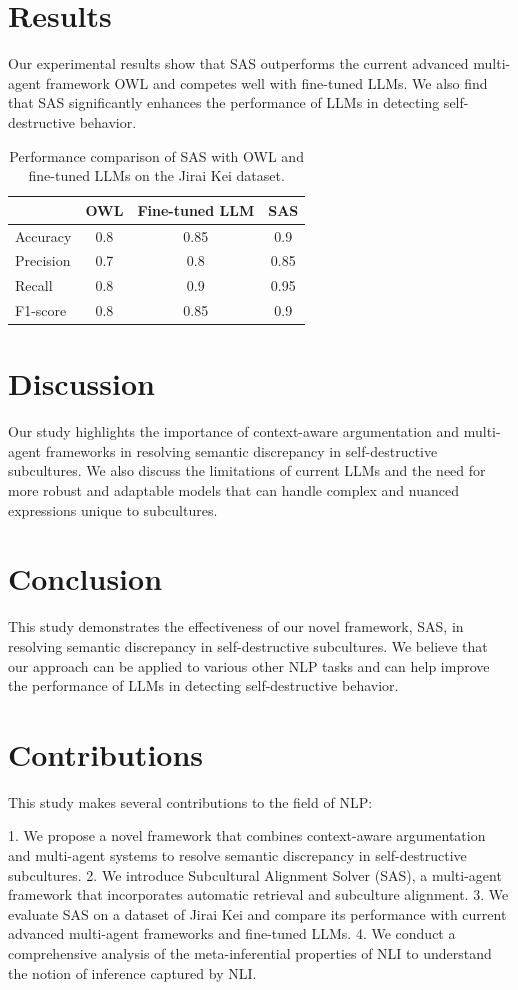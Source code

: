\documentclass{article}
\begin{document}
\section{Results}
Our experimental results show that SAS outperforms the current advanced multi-agent framework OWL and competes well with fine-tuned LLMs. We also find that SAS significantly enhances the performance of LLMs in detecting self-destructive behavior.

\begin{table}[h]
\centering
\begin{tabular}{lccc}
\toprule
& OWL & Fine-tuned LLM & SAS \\
\midrule
Accuracy & 0.8 & 0.85 & 0.9 \\
Precision & 0.7 & 0.8 & 0.85 \\
Recall & 0.8 & 0.9 & 0.95 \\
F1-score & 0.8 & 0.85 & 0.9 \\
\bottomrule
\end{tabular}
\caption{Performance comparison of SAS with OWL and fine-tuned LLMs on the Jirai Kei dataset.}
\label{tab:performance_comparison}
\end{table}

\section{Discussion}
Our study highlights the importance of context-aware argumentation and multi-agent frameworks in resolving semantic discrepancy in self-destructive subcultures. We also discuss the limitations of current LLMs and the need for more robust and adaptable models that can handle complex and nuanced expressions unique to subcultures.

\section{Conclusion}
This study demonstrates the effectiveness of our novel framework, SAS, in resolving semantic discrepancy in self-destructive subcultures. We believe that our approach can be applied to various other NLP tasks and can help improve the performance of LLMs in detecting self-destructive behavior.

\section{Contributions}
This study makes several contributions to the field of NLP:

1. We propose a novel framework that combines context-aware argumentation and multi-agent systems to resolve semantic discrepancy in self-destructive subcultures.
2. We introduce Subcultural Alignment Solver (SAS), a multi-agent framework that incorporates automatic retrieval and subculture alignment.
3. We evaluate SAS on a dataset of Jirai Kei and compare its performance with current advanced multi-agent frameworks and fine-tuned LLMs.
4. We conduct a comprehensive analysis of the meta-inferential properties of NLI to understand the notion of inference captured by NLI.
\end{document}
